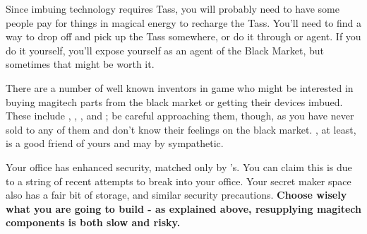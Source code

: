 \documentclass[green]{GL2020}
\begin{document}
Since imbuing technology requires Tass, you will probably need to have some people pay for things in magical energy to recharge the Tass. You’ll need to find a way to drop off and pick up the Tass somewhere, or do it through \cChupSecond{} or \cChupSecond{\their} agent. If you do it yourself, you’ll expose yourself as an agent of the Black Market, but sometimes that might be worth it.

There are a number of well known inventors in game who might be interested in buying magitech parts from the black market or getting their devices imbued. These include \cTechStar{}, \cAssistantScientist{}, \cBunker{}, and \cHeadScientist{}; be careful approaching them, though, as you have never sold to any of them and don’t know their feelings on the black market. \cHeadScientist{}, at least, is a good friend of yours and may by sympathetic.

Your office has enhanced security, matched only by \cPrincipal{}'s. You can claim this is due to a string of recent attempts to break into your office. Your secret maker space also has a fair bit of storage, and similar security precautions. \textbf{Choose wisely what you are going to build - as explained above, resupplying magitech components is both slow and risky.}
\end{document}
